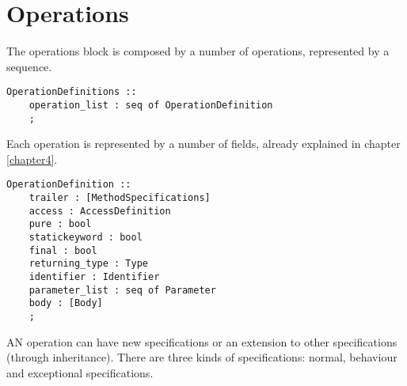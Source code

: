\section{Operations}

The operations block is composed by a number of operations, represented by a sequence.
\medskip
\begin{lstlisting}
OperationDefinitions ::
	operation_list : seq of OperationDefinition
	;
\end{lstlisting}
\medskip

Each operation is represented by a number of fields, already explained in chapter \ref{chapter4}.

\medskip
\begin{lstlisting}	
OperationDefinition :: 
	trailer : [MethodSpecifications]
	access : AccessDefinition
	pure : bool
	statickeyword : bool
	final : bool
	returning_type : Type
	identifier : Identifier
	parameter_list : seq of Parameter
	body : [Body]
	;
\end{lstlisting}
\medskip

AN operation can have new specifications or an extension to other specifications (through inheritance). There are three kinds of specifications: normal, behaviour and exceptional specifications.

